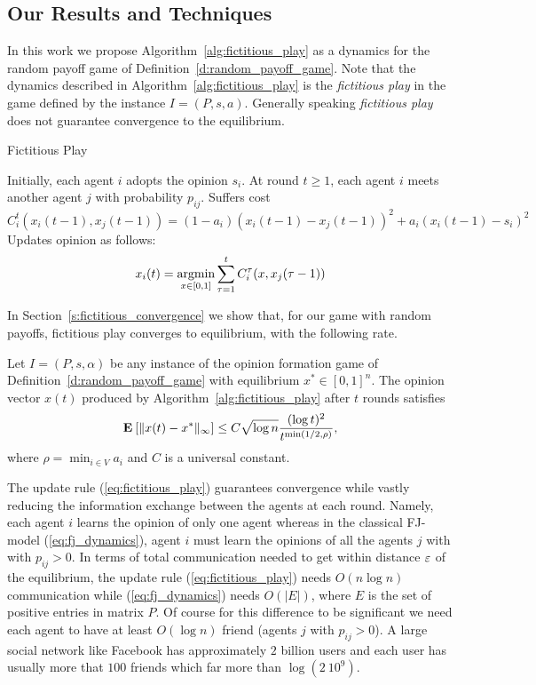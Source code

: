 \subsection{Our Results and Techniques}
In this work we propose Algorithm~\ref{alg:fictitious_play} as a dynamics
for the random payoff game of Definition~\ref{d:random_payoff_game}.
Note that the dynamics described in Algorithm~\ref{alg:fictitious_play} is the
\emph{fictitious play} in the game defined by the instance
$I=(P,s,a)$. Generally speaking \emph{fictitious play} does not guarantee
convergence to the equilibrium.
\begin{algorithm}
  \caption{Fictitious Play}
  \label{alg:fictitious_play}
  \begin{algorithmic}[1]
    \State Initially, each agent $i$ adopts the opinion $s_i$.
    \State At round $t \geq 1$, each agent $i$ meets another agent $j$ with probability $p_{ij}$.
    \State Suffers cost
    \(
      C^t_i(x_i(t-1),x_{j}(t-1))=(1-a_i)(x_i(t-1)
      -x_j(t-1))^2 + a_i(x_i(t-1)-s_i)^2
    \)
    \State Updates opinion as follows:
    \begin{equation}\label{eq:fictitious_play}
      x_i(t) =
      \operatorname*{argmin}_{x \in [0,1]}
      \sum_{\tau=1}^tC^{\tau}_i(x,x_j(\tau-1))
    \end{equation}
\end{algorithmic}
\end{algorithm}
In Section~\ref{s:fictitious_convergence} we show that, for our game with
random payoffs, fictitious play converges to equilibrium, with the following
rate.
\begin{theorem}\label{t:fictitious_convergence}
  Let $I = (P,s, \alpha)$ be any instance of the opinion formation
  game of Definition~\ref{d:random_payoff_game} with equilibrium
  $x^* \in [0,1]^n$.  The opinion vector $x(t)$ produced by
  Algorithm~\ref{alg:fictitious_play} after $t$ rounds satisfies
  \[
    \bm{\mathrm{E}}_{} \left[ \| x(t) - x^* \|_{\infty} \right] \leq
    C \sqrt{\log n}\frac{(\log t)^{2}}{t^{\min(1/2,\rho)}},
  \]
  where $\rho = \min_{i \in V} a_i$ and $C$ is a universal constant.
\end{theorem}
The update rule (\ref{eq:fictitious_play}) guarantees convergence
while vastly reducing the information exchange between the agents
at each round. Namely, each agent $i$ learns the opinion of only one agent
whereas in the classical FJ-model (\ref{eq:fj_dynamics}), agent $i$ must
learn the opinions of all the agents $j$ with with $p_{ij}>0$. In terms of
total communication needed to get within distance $\varepsilon$ of the
equilibrium, the update rule (\ref{eq:fictitious_play}) needs
$O(n \log n)$ communication while (\ref{eq:fj_dynamics}) needs
$O(|E|)$, where $E$ is the set of positive entries in matrix $P$. 
Of course for this difference to be significant we need
each agent to have at least $O(\log n)$ friend (agents $j$ with $p_{ij}>0$). A large social
network like Facebook has approximately $2$ billion users and each user
has usually more that $100$ friends which far more than $\log(2\ 10^9)$.

